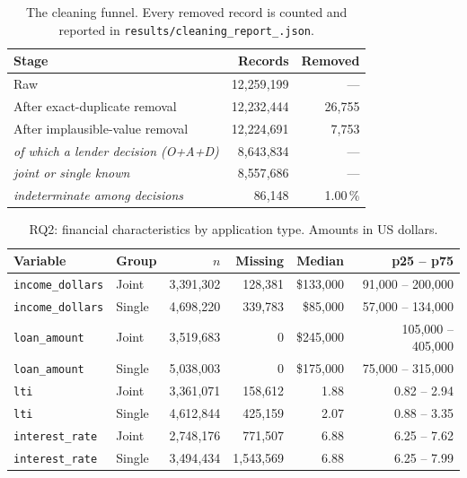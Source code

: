 \documentclass[sigconf,balance=false]{acmart}
\begin{document}
\begin{table}[t]
\caption{The cleaning funnel. Every removed record is counted and reported
         in \texttt{results/cleaning\_\allowbreak report\_\allowbreak *.json}.}
\label{tab:funnel}
\centering
\begin{tabular}{@{}lrr@{}}
\toprule
Stage & Records & Removed \\
\midrule
Raw                                & 12{,}259{,}199 & --- \\
After exact-duplicate removal      & 12{,}232{,}444 & 26{,}755 \\
After implausible-value removal    & 12{,}224{,}691 &  7{,}753 \\
\quad\emph{of which a lender decision (O+A+D)} & 8{,}643{,}834 & --- \\
\quad\emph{joint or single known}   & 8{,}557{,}686 & --- \\
\quad\emph{indeterminate among decisions} & 86{,}148 & 1.00\,\% \\
\bottomrule
\end{tabular}
\end{table}

\begin{table}[t]
\caption{RQ2: financial characteristics by application type. Amounts in US
         dollars.}
\label{tab:rq2}
\centering
\scriptsize
\begin{tabular}{@{}llrrrr@{}}
\toprule
Variable & Group & $n$ & Missing & Median & p25 -- p75 \\
\midrule
\texttt{income\_\allowbreak dollars} & Joint  & 3{,}391{,}302 & 128{,}381 & \$133{,}000 & 91{,}000 -- 200{,}000 \\
\texttt{income\_\allowbreak dollars} & Single & 4{,}698{,}220 & 339{,}783 &  \$85{,}000 & 57{,}000 -- 134{,}000 \\
\texttt{loan\_\allowbreak amount}     & Joint  & 3{,}519{,}683 &       0 & \$245{,}000 & 105{,}000 -- 405{,}000 \\
\texttt{loan\_\allowbreak amount}     & Single & 5{,}038{,}003 &       0 & \$175{,}000 &  75{,}000 -- 315{,}000 \\
\texttt{lti}              & Joint  & 3{,}361{,}071 & 158{,}612 &      1.88 & 0.82 -- 2.94 \\
\texttt{lti}              & Single & 4{,}612{,}844 & 425{,}159 &      2.07 & 0.88 -- 3.35 \\
\texttt{interest\_\allowbreak rate}   & Joint  & 2{,}748{,}176 & 771{,}507 &      6.88 & 6.25 -- 7.62 \\
\texttt{interest\_\allowbreak rate}   & Single & 3{,}494{,}434 & 1{,}543{,}569 & 6.88 & 6.25 -- 7.99 \\
\bottomrule
\end{tabular}
\end{table}
\end{document}
